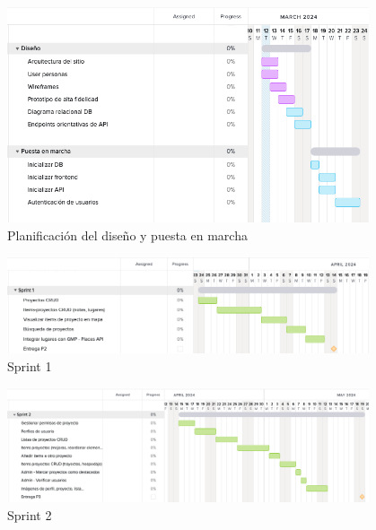 \begin{figure}[H]
\centering
\includegraphics[width=0.95\textwidth]{Figures/Gantt/gantt-2.png}
\caption{Planificación del diseño y puesta en marcha}
\label{gantt-2}
\end{figure}

\begin{figure}[H]
\centering
\includegraphics[width=0.95\textwidth]{Figures/Gantt/gantt-3.png}
\caption{Sprint 1}
\label{gantt-3}
\end{figure}

\begin{figure}[H]
\centering
\includegraphics[width=0.95\textwidth]{Figures/Gantt/gantt-4.png}
\caption{Sprint 2}
\label{gantt-3}
\end{figure}


